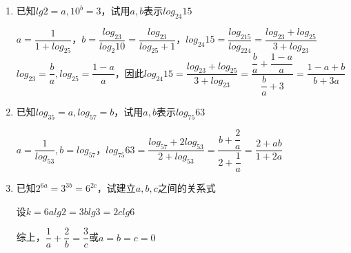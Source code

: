 \begin{enumerate}
\begin{jieda}
\begin{enumerate}
            \item $\dfrac{1}{log_2{3}} + \dfrac{lg13.5}{lg3} = \dfrac{log_3{2}}{log_3{3}} + log_3{13.5} = log_3{27} = 3$
        \end{enumerate}
    \end{jieda}
    \item 已知$lg2 = a, 10^b = 3$，试用$a, b$表示$log_{24}15$
    \begin{jieda}
        $a = \dfrac{1}{1+log_25}$，$b = \dfrac{log_23}{log_2{10}} = \dfrac{log_23}{log_25+1}$，$log_{24}15 = \dfrac{log_215}{log_224} = \dfrac{log_23 + log_25}{3+log_23}$ \\
        $log_23 = \dfrac{b}{a}, log_25 = \dfrac{1-a}{a}$，因此$log_{24}15 = \dfrac{log_23 + log_25}{3+log_23} = \dfrac{\dfrac{b}{a} + \dfrac{1-a}{a}}{\dfrac{b}{a}+3} = \dfrac{1-a+b}{b+3a}$
    \end{jieda}
    \item 已知$log_35 = a, log_57 = b$，试用$a, b$表示$log_{75}63$
    \begin{jieda}
        $a = \dfrac{1}{log_53}, b = log_57$，$log_{75}63 = \dfrac{log_57+2log_53}{2+log_53} = \dfrac{b+\dfrac{2}{a}}{2 + \dfrac{1}{a}} = \dfrac{2+ab}{1+2a}$
    \end{jieda}
    \item 已知$2^{6a} = 3^{3b} = 6^{2c}$，试建立$a, b, c$之间的关系式
    \begin{jieda}
        设$k = 6alg2 = 3blg3 = 2clg6$
        综上，$\dfrac{1}{a} + \dfrac{2}{b} = \dfrac{3}{c}$或$a = b = c = 0$
    \end{jieda}
\end{enumerate}
